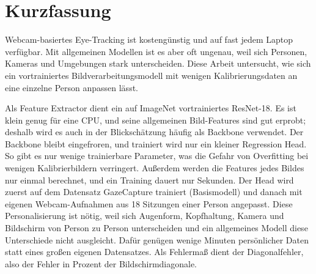 
\BHTTitelseite


\chapter*{Kurzfassung}
Webcam-basiertes Eye-Tracking ist kostengünstig und auf fast jedem Laptop
verfügbar. Mit allgemeinen Modellen ist es aber oft ungenau, weil sich Personen,
Kameras und Umgebungen stark unterscheiden. Diese Arbeit untersucht, wie sich
ein vortrainiertes Bildverarbeitungsmodell mit wenigen Kalibrierungsdaten an
eine einzelne Person anpassen lässt.

Als Feature Extractor dient ein auf ImageNet vortrainiertes ResNet-18. Es ist
klein genug für eine CPU, und seine allgemeinen Bild-Features sind gut erprobt;
deshalb wird es auch in der Blickschätzung häufig als Backbone verwendet. Der
Backbone bleibt eingefroren, und trainiert wird nur ein kleiner Regression
Head. So gibt es nur wenige trainierbare Parameter, was die Gefahr von
Overfitting bei wenigen Kalibrierbildern verringert. Außerdem werden die
Features jedes Bildes nur einmal berechnet, und ein Training dauert nur
Sekunden. Der Head wird zuerst auf dem Datensatz GazeCapture trainiert
(Basismodell) und danach mit eigenen Webcam-Aufnahmen aus 18 Sitzungen einer
Person angepasst. Diese Personalisierung ist nötig, weil sich Augenform,
Kopfhaltung, Kamera und Bildschirm von Person zu Person unterscheiden und ein
allgemeines Modell diese Unterschiede nicht ausgleicht. Dafür genügen wenige
Minuten persönlicher Daten statt eines großen eigenen Datensatzes. Als
Fehlermaß dient der Diagonalfehler, also der Fehler in Prozent der
Bildschirmdiagonale.

